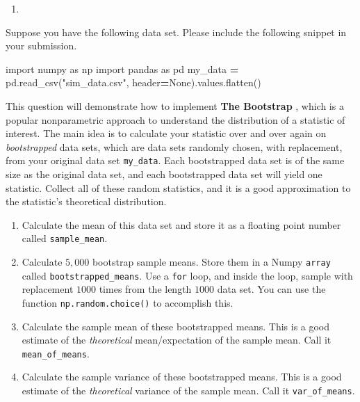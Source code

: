 \documentclass[
  12pt,
  krantz2]{krantz}
\makeatletter
\newenvironment{Shaded}{\begin{snugshade}}{\end{snugshade}}
\newcommand{\ImportTok}[1]{#1}
\newcommand{\NormalTok}[1]{#1}
\newcommand{\OperatorTok}[1]{\textcolor[rgb]{0.43,0.43,0.43}{\textbf{#1}}}
\newcommand{\StringTok}[1]{\textcolor[rgb]{0.5,0.5,0.5}{#1}}
\newcommand{\VariableTok}[1]{\textcolor[rgb]{0,0,0}{#1}}
\providecommand{\tightlist}{%
  \setlength{\itemsep}{0pt}\setlength{\parskip}{0pt}}
\newenvironment{kframe}{%
\medskip{}
\setlength{\fboxsep}{.8em}
 \def\at@end@of@kframe{}%
 \ifinner\ifhmode%
  \def\at@end@of@kframe{\end{minipage}}%
  \begin{minipage}{\columnwidth}%
 \fi\fi%
 \def\FrameCommand##1{\hskip\@totalleftmargin \hskip-\fboxsep
 \colorbox{shadecolor}{##1}\hskip-\fboxsep
     \hskip-\linewidth \hskip-\@totalleftmargin \hskip\columnwidth}%
 \MakeFramed {\advance\hsize-\width
   \@totalleftmargin\z@ \linewidth\hsize
   \@setminipage}}%
 {\par\unskip\endMakeFramed%
 \at@end@of@kframe}
\renewenvironment{Shaded}{\begin{kframe}}{\end{kframe}}
\makeatother
\begin{document}
\begin{enumerate}
\def\labelenumi{\arabic{enumi}.}
\setcounter{enumi}{1}
\tightlist
\item
\end{enumerate}

Suppose you have the following data set. Please include the following snippet in your submission.

\begin{Shaded}
\begin{Highlighting}[]
\ImportTok{import}\NormalTok{ numpy }\ImportTok{as}\NormalTok{ np}
\ImportTok{import}\NormalTok{ pandas }\ImportTok{as}\NormalTok{ pd}
\NormalTok{my\_data }\OperatorTok{=}\NormalTok{ pd.read\_csv(}\StringTok{"sim\_data.csv"}\NormalTok{, header}\OperatorTok{=}\VariableTok{None}\NormalTok{).values.flatten()}
\end{Highlighting}
\end{Shaded}

This question will demonstrate how to implement \textbf{The Bootstrap} \citep{bootstrap}, which is a popular nonparametric approach to understand the distribution of a statistic of interest. The main idea is to calculate your statistic over and over again on \emph{bootstrapped} data sets, which are data sets randomly chosen, with replacement, from your original data set \texttt{my\_data}. Each bootstrapped data set is of the same size as the original data set, and each bootstrapped data set will yield one statistic. Collect all of these random statistics, and it is a good approximation to the statistic's theoretical distribution.

\begin{enumerate}
\def\labelenumi{\alph{enumi})}
\tightlist
\item
  Calculate the mean of this data set and store it as a floating point number called \texttt{sample\_mean}.
\item
  Calculate \(5,000\) bootstrap sample means. Store them in a Numpy \texttt{array} called \texttt{bootstrapped\_means}. Use a \texttt{for} loop, and inside the loop, sample with replacement \(1000\) times from the length \(1000\) data set. You can use the function \texttt{np.random.choice()} to accomplish this.
\item
  Calculate the sample mean of these bootstrapped means. This is a good estimate of the \emph{theoretical} mean/expectation of the sample mean. Call it \texttt{mean\_of\_means}.
\item
  Calculate the sample variance of these bootstrapped means. This is a good estimate of the \emph{theoretical} variance of the sample mean. Call it \texttt{var\_of\_means}.
\end{enumerate}
\end{document}

